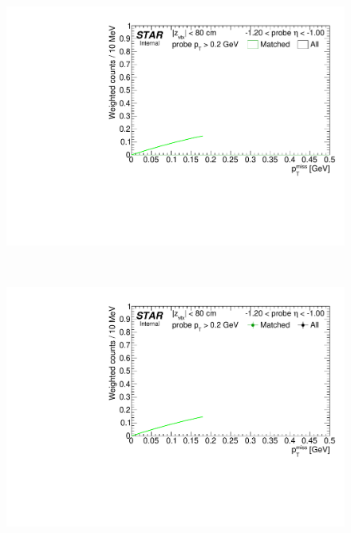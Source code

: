 \begin{figure}[h!]
{}~
\parbox{0.24\textwidth}{
  \centering
  \includegraphics[width=\linewidth,page=3]{graphics/correctionsToEff/TOF_tagAndProbe/Fitting_effVsEta_mc.CPT2.pdf}%
}~~~~
\parbox{0.24\textwidth}{
  \centering
  \includegraphics[width=\linewidth,page=4]{graphics/correctionsToEff/TOF_tagAndProbe/Fitting_effVsEta_data.CPT2.pdf}%

}
\end{figure}
